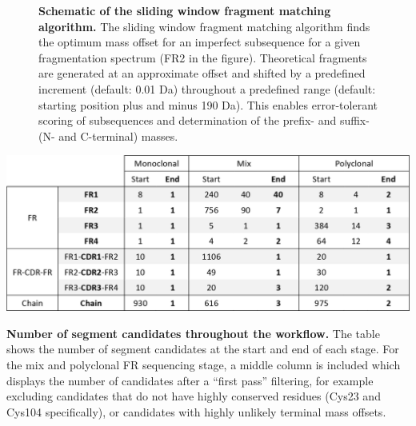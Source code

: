 \begin{subappendices}
\begin{figure}[!htb]
    \caption{\textbf{Schematic of the sliding window fragment matching algorithm.} The sliding window fragment matching algorithm finds the optimum mass offset for an imperfect subsequence for a given fragmentation spectrum (FR2 in the figure). Theoretical fragments are generated at an approximate offset and shifted by a predefined increment (default: 0.01 Da) throughout a predefined range (default: starting position plus and minus 190 Da). This enables error-tolerant scoring of subsequences and determination of the prefix- and suffix- (N- and C-terminal) masses.
    }
    \label{fig:figs5.2}
  \end{figure}


  \begin{table}[!hbt]
    \includegraphics[]{Chapter.5/Figures/ts2.png}
    \caption{
      \textbf{Number of segment candidates throughout the workflow.} The table shows the number of segment candidates at the start and end of each stage. For the mix and polyclonal FR sequencing stage, a middle column is included which displays the number of candidates after a “first pass” filtering, for example excluding candidates that do not have highly conserved residues (Cys23 and Cys104 specifically), or candidates with highly unlikely terminal mass offsets.
    }
    \label{tab:tabs5.2}
  \end{table}


\end{subappendices}
